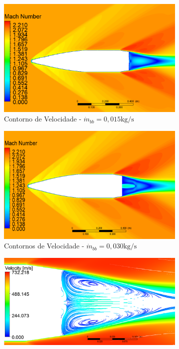 \begin{figure}[!ht]
\begin{subfigure}[b]{0.47\textwidth}
        \includegraphics[width=\textwidth]{contorno-velocidade-2306K-vazao-0015-1pol.png}
        \caption{Contorno de Velocidade - $\Dot{m}_{bb} = 0,015 \unit{\kg/\s}$}
        \label{fig:contorno-velocidade-bb-1pol-vazao0015}
    \end{subfigure}
    \hfill
	\begin{subfigure}[b]{0.47\textwidth}
        \centering
        \includegraphics[width=\textwidth]{contorno-velocidade-2306K-vazao-0030-1pol.png}
        \caption{Contornos de Velocidade - $\Dot{m}_{bb} = 0,030 \unit{\kg/\s}$}
        \label{fig:contorno-velocidade-bb-1pol-vazao0030}
    \end{subfigure}
    \hfill
    \begin{subfigure}[b]{0.47\textwidth}
        \centering
        \includegraphics[width=\textwidth]{corrente-velocidade-2306K-vazao-0015-1pol.png}

\end{subfigure}
\end{figure}
